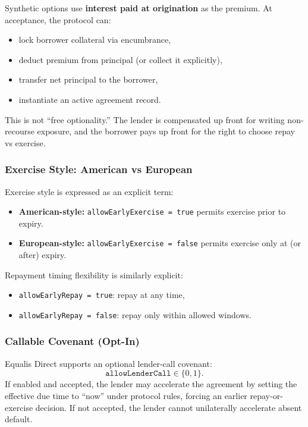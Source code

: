 \documentclass[version=preprint]{iacrcc}
\begin{document}
Synthetic options use \textbf{interest paid at origination} as the premium. At acceptance, the protocol can:
\begin{itemize}
  \item lock borrower collateral via encumbrance,
  \item deduct premium from principal (or collect it explicitly),
  \item transfer net principal to the borrower,
  \item instantiate an active agreement record.
\end{itemize}

This is not ``free optionality.'' The lender is compensated up front for writing non-recourse exposure, and the borrower pays up front for the right to choose repay vs exercise.

\subsubsection{Exercise Style: American vs European}

Exercise style is expressed as an explicit term:
\begin{itemize}
  \item \textbf{American-style:} \texttt{allowEarlyExercise = true} permits exercise prior to expiry.
  \item \textbf{European-style:} \texttt{allowEarlyExercise = false} permits exercise only at (or after) expiry.
\end{itemize}

Repayment timing flexibility is similarly explicit:
\begin{itemize}
  \item \texttt{allowEarlyRepay = true}: repay at any time,
  \item \texttt{allowEarlyRepay = false}: repay only within allowed windows.
\end{itemize}

\subsubsection{Callable Covenant (Opt-In)}

Equalis Direct supports an optional lender-call covenant:
\[
\texttt{allowLenderCall} \in \{0,1\}.
\]
If enabled and accepted, the lender may accelerate the agreement by setting the effective due time to ``now'' under protocol rules, forcing an earlier repay-or-exercise decision. If not accepted, the lender cannot unilaterally accelerate absent default.
\end{document}
